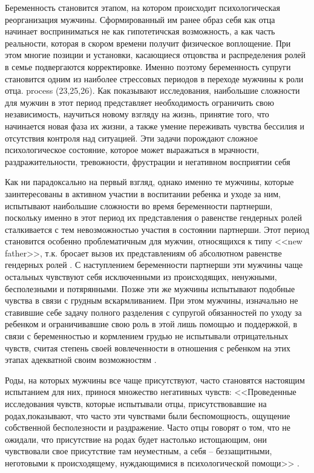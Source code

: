 \documentclass{../../common/thesisbyxetex}
\begin{document}
Беременность становится этапом, на котором происходит психологическая реорганизация мужчины.
Сформированный им ранее образ себя как отца начинает восприниматься не как гипотетичская
возможность, а как часть реальности, которая в скором времени получит физическое воплощение. При
этом многие позиции и установки, касающиеся отцовства и распределения ролей в семье подвергаются
корректировке. Именно поэтому беременность супруги становится одним из наиболее стрессовых периодов
в переходе мужчины к роли отца. process (23,25,26). Как показывают исследования, наибольшие
сложности для мужчин в этот период представляет необходимость ограничить свою независимость,
научиться новому взгляду на жизнь, принятие того, что начинается новая фаза их жизни, а также
умение  переживать чувства бессилия и отсутствия контроля над ситуацией. Эти задачи порождают
сложное  психологическое состояние, которое может выражаться в мрачности, раздражительности,
тревожности, фрустрации и негативном восприятии себя  \cite[314]{flit}


Как ни парадоксально на первый взгляд, однако именно  те мужчины, которые 
заинтересованы в активном участии в воспитании ребенка и уходе за ним,
испытывают наибольшие сложности во время беременности партнерши, поскольку именно в этот период их 
представления  о равенстве гендерных ролей сталкивается с тем невозможностью участия в состоянии 
партнерши.  Этот период становится особенно проблематичным для
мужчин, относящихся к типу <<new father>>, т.к. бросает вызов их представлениям об абсолютном
равенстве гендерных ролей \cite[20]{long}. С наступлением беременности партнерши эти мужчины 
чаще остальных чувствуют себя исключенными из происходящих, ненужными, бесполезными и 
потярянными. Позже эти же мужчины испытывают подобные чувства в связи с грудным вскармливанием. При 
этом мужчины, изначально не ставившие себе задачу полного разделения с супругой обязанностей по 
уходу за ребенком и ограничивавшие свою роль в этой лишь помощью и поддержкой, в связи с 
беременностью и кормлением грудью не испытывали отрицательных чувств, считая степень 
своей вовлеченности в отношения с ребенком на этих этапах адекватной своим возможностям 
 \cite[21]{long}.

Роды, на которых мужчины все чаще присутствуют, часто становятся  настоящим испытанием
для них, принося множество негативных чувств: <<Проведенные исследования чувств, которые
испытывали отцы, присутствовавшие на родах,показывают, что часто эти чувствами были
беспомощность, ощущение собственной бесполезности и раздражение. Часто отцы говорят о том,
что не ожидали, что присутствие на родах будет настолько истощающим, они чувствовали свое
присутствие там неуместным, а себя -- беззащитными, неготовыми к происходящему, нуждающимися в
психологической помощи>> \cite[313]{flit}.
\end{document}
